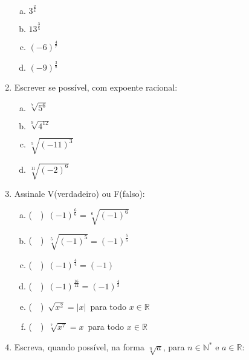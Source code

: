 \documentclass[a4paper,14pt]{article}
\begin{document}
\begin{multicols}{2}
\begin{enumerate}
        \begin{enumerate}[a)] 
        	\item $3^\frac{2}{4}$ \\
        	\item $13^\frac{3}{5}$ \\
        	\item $(-6)^\frac{4}{7}$ \\
        	\item $(-9)^\frac{3}{8}$ \\
        \end{enumerate}
        \item Escrever se possível, com expoente racional:
        \begin{enumerate}[a)]
        	\item $\sqrt[7]{5^6}$ \\
        	\item $\sqrt[9]{4^{12}}$ \\
        	\item $\sqrt[5]{(-11)^3}$ \\
        	\item $\sqrt[11]{(-2)^6}$ \\
        \end{enumerate}
        \item Assinale V(verdadeiro) ou F(falso):
        \begin{enumerate}[a)]
        	\item (~~)~$(-1)^\frac{6}{6} = \sqrt[6]{(-1)^6}$ \\
        	\item (~~)~$\sqrt[5]{(-1)^5} = (-1)^\frac{5}{5}$ \\
        	\item (~~)~$(-1)^\frac{4}{4} = (-1)$ \\
        	\item (~~)~$(-1)^\frac{16}{12} = (-1)^\frac{4}{3}$ \\
        	\item (~~)~$\sqrt{x^2} = |x|$~para todo $x \in \mathbb{R}$ \\
        	\item (~~)~$\sqrt[7]{x^7} = x$~para todo $x \in \mathbb{R}$ \\
        \end{enumerate}
        \item Escreva, quando possível, na forma $\sqrt[n]{a}$, para $n \in \mathbb{N^*}$ e $a \in \mathbb{R}$:
        \begin{enumerate}[a)]

\end{enumerate}
\end{enumerate}
\end{multicols}
\end{document}
